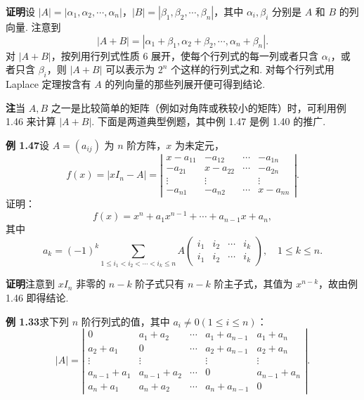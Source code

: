 \documentclass[UTF8, 12pt, fontset=fandol, oneside]{ctexart}
\begin{document}
\noindent\textbf{证明}\quad 设 $|A|=|\alpha_1,\alpha_2,\cdots,\alpha_n|$，$|B|=|\beta_1,\beta_2,\cdots,\beta_n|$，其中 $\alpha_i,\beta_i$ 分别是 $A$ 和 $B$ 的列向量. 注意到
\[
|A+B|=|\alpha_1+\beta_1,\alpha_2+\beta_2,\cdots,\alpha_n+\beta_n|.
\]
对 $|A+B|$，按列用行列式性质 6 展开，使每个行列式的每一列或者只含 $\alpha_i$，或者只含 $\beta_i$，则 $|A+B|$ 可以表示为 $2^n$ 个这样的行列式之和. 对每个行列式用 Laplace 定理按含有 $A$ 的列向量的那些列展开便可得到结论.

\noindent\textbf{注}\quad 当 $A,B$ 之一是比较简单的矩阵（例如对角阵或秩较小的矩阵）时，可利用例 1.46 来计算 $|A+B|$. 下面是两道典型例题，其中例 1.47 是例 1.40 的推广.

\noindent\textbf{例 1.47}\quad 设 $A=(a_{ij})$ 为 $n$ 阶方阵，$x$ 为未定元，
\[
f(x)=|xI_n-A|
=\left|\begin{array}{cccc}
x-a_{11} & -a_{12} & \cdots & -a_{1n}\\
-a_{21} & x-a_{22} & \cdots & -a_{2n}\\
\vdots & \vdots &        & \vdots\\
-a_{n1} & -a_{n2} & \cdots & x-a_{nn}
\end{array}\right|.
\]
证明：
\[
f(x)=x^n+a_1x^{n-1}+\cdots+a_{n-1}x+a_n,
\]
其中
\[
a_k=(-1)^k\sum_{1\le i_1<i_2<\cdots<i_k\le n}
A\begin{pmatrix}i_1&i_2&\cdots&i_k\\ i_1&i_2&\cdots&i_k\end{pmatrix},\quad 1\le k\le n.
\]

\noindent\textbf{证明}\quad 注意到 $xI_n$ 非零的 $n-k$ 阶子式只有 $n-k$ 阶主子式，其值为 $x^{n-k}$，故由例 1.46 即得结论.

\noindent\textbf{例 1.33}\quad 求下列 $n$ 阶行列式的值，其中 $a_i\ne0(1\le i\le n)$：
\[
|A|=\left|\begin{array}{ccccc}
0 & a_1+a_2 & \cdots & a_1+a_{n-1} & a_1+a_n\\
a_2+a_1 & 0 & \cdots & a_2+a_{n-1} & a_2+a_n\\
\vdots & \vdots &        & \vdots & \vdots\\
a_{n-1}+a_1 & a_{n-1}+a_2 & \cdots & 0 & a_{n-1}+a_n\\
a_n+a_1 & a_n+a_2 & \cdots & a_n+a_{n-1} & 0
\end{array}\right|.
\]
\end{document}
